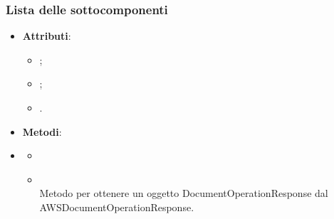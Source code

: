 \documentclass[10pt, a4paper]{article}
\begin{document}

\subsubsection{Lista delle sottocomponenti}


\label{AWSDocumentOperationResponseDettaglio}
\begin{itemize}
    \item \textbf{Attributi}:
    \begin{itemize}
        \item {};
        \item {};
        \item {}.
    \end{itemize}
    \item \textbf{Metodi}:
    \item \begin{itemize}
        \item \item {}\\
        Metodo per ottenere un oggetto DocumentOperationResponse dal AWSDocumentOperationResponse.
    \end{itemize}
\end{itemize}
\end{document}
